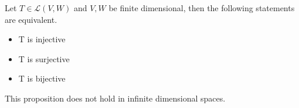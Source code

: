 \begin{proposition}
	Let $T \in \mathcal{L}(V, W)$ and $V, W$ be finite dimensional, then the following statements are equivalent.
	\begin{itemize}
		\item T is injective
		\item T is surjective
		\item T is bijective
	\end{itemize} 
\end{proposition}

This proposition does not hold in infinite dimensional spaces. 




